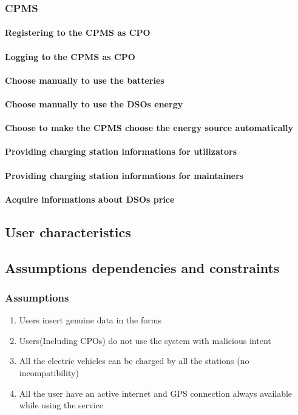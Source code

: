 \subsubsection{\ac{CPMS}}
\paragraph{Registering to the \ac{CPMS} as \ac{CPO}}
\paragraph{Logging to the \ac{CPMS} as \ac{CPO}}
\paragraph{Choose manually to use the batteries}
\paragraph{Choose manually to use the \acp{DSO} energy}
\paragraph{Choose to make the \ac{CPMS} choose the energy source automatically}
\paragraph{Providing charging station informations for utilizators}
\paragraph{Providing charging station informations for maintainers}
\paragraph{Acquire informations about \acp{DSO} price}



\subsection{User characteristics}

\subsection{Assumptions dependencies and constraints}
\subsubsection{Assumptions}
\begin{enumerate}[label=DA\arabic*]
      \item Users insert genuine data in the forms
      \item Users(Including CPOs) do not use the system with malicious intent
      \item All the electric vehicles can be charged by all the stations (no incompatibility)
      \item All the user have an active internet and GPS connection always available while using the service
\end{enumerate}
